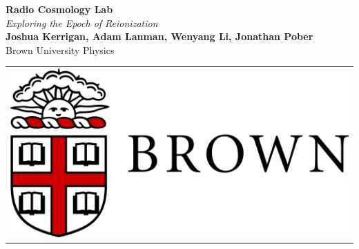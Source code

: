 \documentclass[a0,landscape]{a0poster}
\begin{document}


\begin{minipage}[b]{0.55\textwidth}
\veryHuge \color{NavyBlue} \textbf{Radio Cosmology Lab} \color{Black}\\ %
\Huge\textit{Exploring the Epoch of Reionization}\\[1cm] %
\huge \textbf{Joshua Kerrigan, Adam Lanman, Wenyang Li, Jonathan Pober}\\ %
\huge Brown University Physics\\ %
\end{minipage}
\begin{minipage}[b]{0.5\linewidth}
\begin{tabular}[t]{l@{}}
\includegraphics[width=15cm]{brown-logo.png} %
\end{tabular}
\end{minipage}

\end{document}
